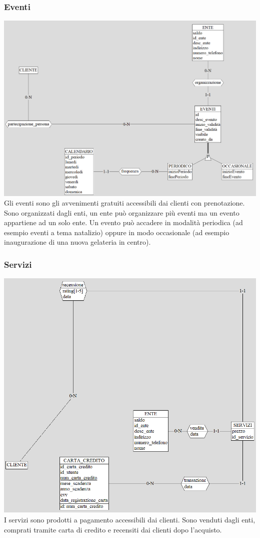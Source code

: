 \subsubsection{Eventi}
\includegraphics[width=0.95\columnwidth]{images/Eventi.png} \\
Gli eventi sono gli avvenimenti gratuiti accessibili dai clienti con prenotazione.
Sono organizzati dagli enti, un ente può organizzare più eventi ma un evento appartiene ad un solo ente.
Un evento può accadere in modalità periodica (ad esempio eventi a tema natalizio) oppure in modo occasionale (ad esempio inaugurazione di una nuova gelateria in centro).


\subsubsection{Servizi}
\includegraphics[width=0.95\columnwidth]{images/Servizi.png} \\
I servizi sono prodotti a pagamento accessibili dai clienti.
Sono venduti dagli enti, comprati tramite carta di credito e recensiti dai clienti dopo l'acquisto.


